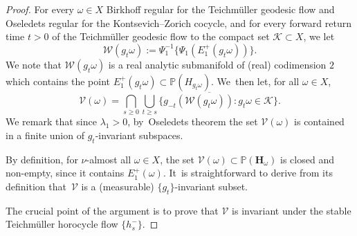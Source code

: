 \documentclass[10pt]{amsart}
\let\sep:
\theoremstyle{plain}
\theoremstyle{definition}
\numberwithin{equation}{subsection}
\newcommand\bP{\mathbb{P}}
\newcommand\cK{\mathcal{K}}
\newcommand\cV{\mathcal{V}}
\newcommand\cW{\mathcal{W}}
\newcommand{\bfH}{\boldsymbol{H}}
\begin{document}
\begin{proof}
For every $\omega\in X$
Birkhoff regular for the Teichmüller geodesic flow and Oseledets regular for the Kontsevich--Zorich cocycle, and for every forward return time $t > 0$ of the Teichmüller geodesic flow to the compact set $\cK \subset X$, we let
\begin{equation}
\label{eq:cW}
\cW (g_{t}\omega):= \Psi_1^{-1} \bigl\{ \Psi_1 (E^+_1 (g_{t} \omega)) \bigr\}.
\end{equation}
We note that $\cW(g_{t}\omega)$ is a real analytic submanifold of (real) codimension $2$
which contains the point $E^+_1(g_{t}\omega) \subset \bP (H_{g_{t}\omega})$. We~then let, for all $\omega \in X$,
\[
\cV (\omega) = \bigcap_{s\geq 0} \overline{\bigcup_{t\geq s} \{ g_{-t} \left(\cW(g_{t}\omega)\right) \sep g_{t}\omega \in \cK\} }.
\]
We remark that since $\lambda_1>0$, by~Oseledets theorem the set $\cV(\omega)$ is contained in a finite union of $g_t$-invariant subspaces.

By definition, for $\nu$-almost all $\omega \in X$, the set $\cV(\omega)
\subset \bP({\bfH}_\omega)$ is closed and non-empty, since it contains $E^+_1(\omega)$. It~is straightforward to derive from its definition that~$\cV$ is a (measurable) $\{g_t\}$-invariant subset.

The crucial point of the argument is to prove that
$\cV$ is invariant under the stable Teichmüller horocycle flow $\{h^-_s\}$.


\end{proof}
\end{document}
